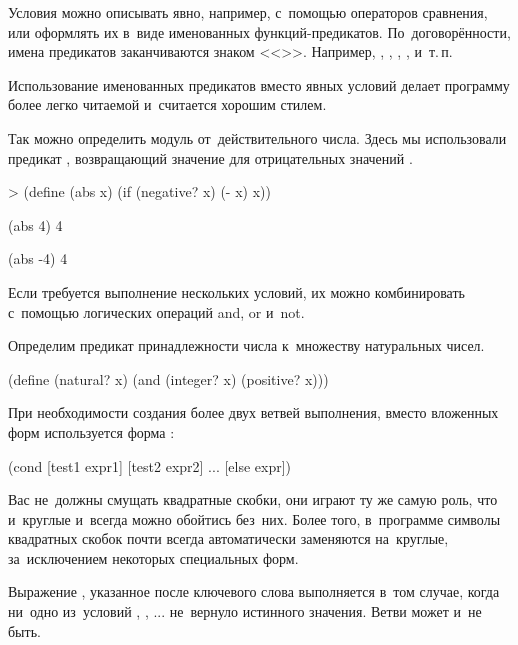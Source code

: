 Условия можно описывать явно, например, с~помощью операторов сравнения, или оформлять их в~виде именованных функций-предикатов. По~договорённости, имена предикатов заканчиваются знаком <<>>. Например, , , , ,  и~т.\,п.

Использование именованных предикатов вместо явных условий делает программу более легко читаемой и~считается хорошим стилем.

\begin{example}{Так можно определить модуль от~действительного числа. Здесь мы использовали предикат , возвращающий значение  для отрицательных значений .}
\begin{ExampleCode}[emph=x]
> (define (abs x)
    (if (negative? x) 
        (- x) x))
\end{ExampleCode}

\REPL
  {(abs 4)}
  {4}

\REPL
  {(abs -4)}
  {4}
\end{example}

Если требуется выполнение нескольких условий, их можно комбинировать с~помощью логических операций \si{and}, \si{or} и~\si{not}.


\begin{example}{Определим предикат принадлежности числа к~множеству натуральных чисел.}
\begin{ExampleCode}
(define (natural? x)
  (and (integer? x)
       (positive? x)))
\end{ExampleCode}
\end{example}

При необходимости создания более двух ветвей выполнения, вместо вложенных форм  используется форма :
\begin{SchemeCode}
(cond
  [test1 expr1]
  [test2 expr2]
  ...
  [else expr])
\end{SchemeCode}

Вас не~должны смущать квадратные скобки, они играют ту же самую роль, что и~круглые и~всегда можно обойтись без~них. Более того, в~программе \DrRacket символы квадратных скобок почти всегда автоматически заменяются на~круглые, за~исключением некоторых специальных форм.

Выражение , указанное после ключевого слова  выполняется в~том случае, когда ни~одно из~условий , , ... не~вернуло истинного значения. Ветви  может и~не быть.

